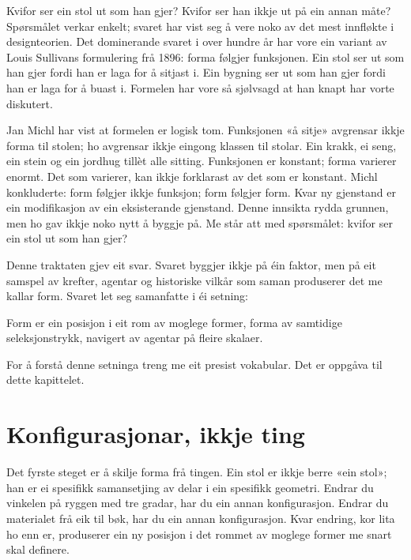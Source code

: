 

Kvifor ser ein stol ut som han gjer? Kvifor ser han ikkje ut på ein annan måte? Spørsmålet verkar enkelt; svaret har vist seg å vere noko av det mest innfløkte i designteorien. Det dominerande svaret i over hundre år har vore ein variant av Louis Sullivans formulering frå 1896: forma følgjer funksjonen. Ein stol ser ut som han gjer fordi han er laga for å sitjast i. Ein bygning ser ut som han gjer fordi han er laga for å buast i. Formelen har vore så sjølvsagd at han knapt har vorte diskutert.

Jan Michl har vist at formelen er logisk tom. Funksjonen «å sitje» avgrensar ikkje forma til stolen; ho avgrensar ikkje eingong klassen til stolar. Ein krakk, ei seng, ein stein og ein jordhug tillèt alle sitting. Funksjonen er konstant; forma varierer enormt. Det som varierer, kan ikkje forklarast av det som er konstant. Michl konkluderte: form følgjer ikkje funksjon; form følgjer form. Kvar ny gjenstand er ein modifikasjon av ein eksisterande gjenstand. Denne innsikta rydda grunnen, men ho gav ikkje noko nytt å byggje på. Me står att med spørsmålet: kvifor ser ein stol ut som han gjer?

Denne traktaten gjev eit svar. Svaret byggjer ikkje på éin faktor, men på eit samspel av krefter, agentar og historiske vilkår som saman produserer det me kallar form. Svaret let seg samanfatte i éi setning:

\begin{overgang}
Form er ein posisjon i eit rom av moglege former, forma av samtidige seleksjonstrykk, navigert av agentar på fleire skalaer.
\end{overgang}

For å forstå denne setninga treng me eit presist vokabular. Det er oppgåva til dette kapittelet.

\section*{Konfigurasjonar, ikkje ting}


Det fyrste steget er å skilje forma frå tingen. Ein stol er ikkje berre «ein stol»; han er ei spesifikk samansetjing av delar i ein spesifikk geometri. Endrar du vinkelen på ryggen med tre gradar, har du ein annan konfigurasjon. Endrar du materialet frå eik til bøk, har du ein annan konfigurasjon. Kvar endring, kor lita ho enn er, produserer ein ny posisjon i det rommet av moglege former me snart skal definere.

